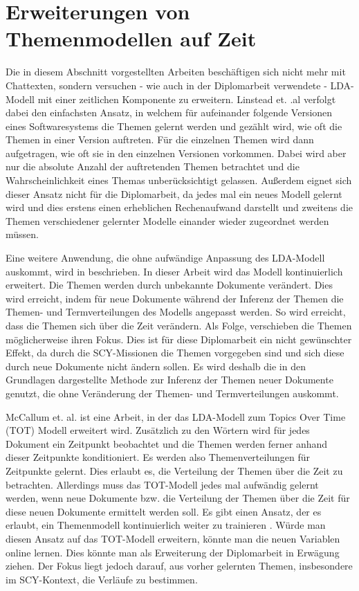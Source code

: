 \section{Erweiterungen von Themenmodellen auf Zeit}

Die in diesem Abschnitt vorgestellten Arbeiten beschäftigen sich nicht mehr mit Chattexten, sondern versuchen - wie auch in der Diplomarbeit verwendete - LDA-Modell mit einer zeitlichen Komponente zu erweitern. Linstead et. .al \citep{ldaSourceCode} verfolgt dabei den einfachsten Ansatz, in welchem für aufeinander folgende Versionen eines Softwaresystems die Themen gelernt werden und gezählt wird, wie oft die Themen in einer Version auftreten. Für die einzelnen Themen wird dann aufgetragen, wie oft sie in den einzelnen Versionen vorkommen. Dabei wird aber nur die absolute Anzahl der auftretenden Themen betrachtet und die Wahrscheinlichkeit eines Themas unberücksichtigt gelassen. Außerdem eignet sich dieser Ansatz nicht für die Diplomarbeit, da jedes mal ein neues Modell gelernt wird und dies erstens einen erheblichen Rechenaufwand darstellt und zweitens die Themen verschiedener gelernter Modelle einander wieder zugeordnet werden müssen.

Eine weitere Anwendung, die ohne aufwändige Anpassung des LDA-Modell auskommt, wird in \citep{onlineLDA2} beschrieben. In dieser Arbeit wird das Modell kontinuierlich erweitert. Die Themen werden durch unbekannte Dokumente verändert. Dies wird erreicht, indem für neue Dokumente während der Inferenz der Themen die Themen- und Termverteilungen des Modells angepasst werden. So wird erreicht, dass die Themen sich über die Zeit verändern. Als Folge, verschieben die Themen möglicherweise ihren Fokus. Dies ist für diese Diplomarbeit ein nicht gewünschter Effekt, da durch die SCY-Missionen die Themen vorgegeben sind und sich diese durch neue Dokumente nicht ändern sollen. Es wird deshalb die in den Grundlagen dargestellte Methode zur Inferenz der Themen neuer Dokumente genutzt, die ohne Veränderung der Themen- und Termverteilungen auskommt. 

McCallum et. al. \citep{topicsOverTime} ist eine Arbeit, in der das LDA-Modell zum Topics Over Time (TOT) Modell erweitert wird. Zusätzlich zu den Wörtern wird für jedes Dokument ein Zeitpunkt beobachtet und die Themen werden ferner anhand dieser Zeitpunkte konditioniert. Es werden also Themenverteilungen für Zeitpunkte gelernt. Dies erlaubt es, die Verteilung der Themen über die Zeit zu betrachten. Allerdings muss das TOT-Modell jedes mal aufwändig gelernt werden, wenn neue Dokumente bzw. die Verteilung der Themen über die Zeit für diese neuen Dokumente ermittelt werden soll. Es gibt einen Ansatz, der es erlaubt, ein Themenmodell kontinuierlich weiter zu trainieren \citep{onlineLDA}. Würde man diesen Ansatz auf das TOT-Modell erweitern, könnte man die neuen Variablen online lernen. Dies könnte man als Erweiterung der Diplomarbeit in Erwägung ziehen. Der Fokus liegt jedoch darauf, aus vorher gelernten Themen, insbesondere im SCY-Kontext, die Verläufe zu bestimmen.

